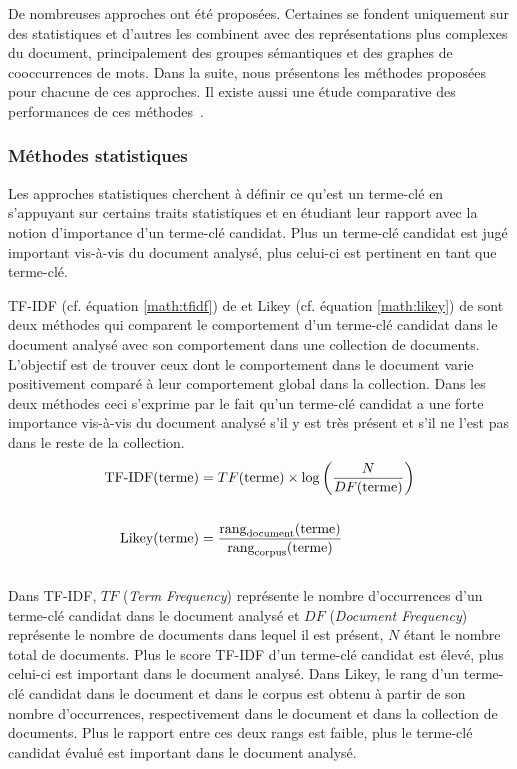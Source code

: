       De nombreuses approches ont été proposées. Certaines se fondent uniquement
      sur des statistiques et d'autres les combinent avec des représentations
      plus complexes du document, principalement des groupes sémantiques et des
      graphes de cooccurrences de mots. Dans la suite, nous présentons les
      méthodes proposées pour chacune de ces approches. Il existe aussi une
      étude comparative des performances de ces
      méthodes~\cite{hassan2010conundrums}.

      \subsubsection{Méthodes statistiques}
      \label{subsubsec:main-state_of_the_art-automatic_keyphrase_extraction-unsupervised_keyphrase_extraction-statistical_approaches}
        Les approches statistiques cherchent à définir ce qu'est un terme-clé en s'appuyant sur certains
        traits statistiques et en étudiant leur rapport avec la notion
        d'importance d'un terme-clé candidat. Plus un terme-clé candidat est
        jugé important vis-à-vis du document analysé, plus celui-ci est
        pertinent en tant que terme-clé.

        TF-IDF (cf. équation \ref{math:tfidf}) de  et
        Likey (cf. équation \ref{math:likey}) de 
        sont deux méthodes qui comparent le comportement d'un terme-clé
        candidat dans le document analysé avec son comportement dans une
        collection de documents. L'objectif est de trouver ceux dont le
        comportement dans le document varie positivement comparé à leur
        comportement global dans la collection. Dans les deux méthodes ceci
        s'exprime par le fait qu'un terme-clé candidat a une forte importance
        vis-à-vis du document analysé s'il y est très présent et s'il ne l'est
        pas dans le reste de la collection.
        \begin{align}
          \text{TF-IDF}(\text{terme}) &= TF(\text{terme}) \times \log\left(\frac{N}{DF(\text{terme})}\right) \label{math:tfidf}\\
          \notag\\
          \text{Likey}(\text{terme}) &= \frac{\text{rang}_{\text{document}}(\text{terme})}{\text{rang}_{\text{corpus}}(\text{terme})} \label{math:likey}
        \end{align}\\
        Dans TF-IDF, $TF$ (\textit{Term Frequency}) représente le nombre
        d'occurrences d'un terme-clé candidat dans le document analysé et $DF$
        (\textit{Document Frequency}) représente le nombre de documents dans
        lequel il est présent, $N$ étant le nombre total de documents. Plus le
        score TF-IDF d'un terme-clé candidat est élevé, plus celui-ci est
        important dans le document analysé. Dans Likey, le rang d'un terme-clé
        candidat dans le document et dans le corpus est obtenu à partir de son
        nombre d'occurrences, respectivement dans le document et dans la
        collection de documents. Plus le rapport entre ces deux rangs est
        faible, plus le terme-clé candidat évalué est important dans le
        document analysé.

